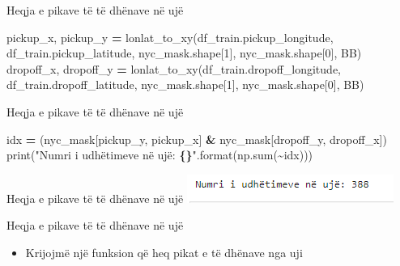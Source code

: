 \documentclass[
  ignorenonframetext,
]{beamer}
\newenvironment{Shaded}{\begin{snugshade}}{\end{snugshade}}
\newcommand{\BuiltInTok}[1]{#1}
\newcommand{\DecValTok}[1]{\textcolor[rgb]{0.00,0.00,0.81}{#1}}
\newcommand{\NormalTok}[1]{#1}
\newcommand{\OperatorTok}[1]{\textcolor[rgb]{0.81,0.36,0.00}{\textbf{#1}}}
\newcommand{\SpecialCharTok}[1]{\textcolor[rgb]{0.81,0.36,0.00}{\textbf{#1}}}
\newcommand{\StringTok}[1]{\textcolor[rgb]{0.31,0.60,0.02}{#1}}
\providecommand{\tightlist}{%
  \setlength{\itemsep}{0pt}\setlength{\parskip}{0pt}}
\begin{document}
\begin{frame}[fragile]{Heqja e pikave të të dhënave në ujë}
\protect\hypertarget{heqja-e-pikave-tuxeb-tuxeb-dhuxebnave-nuxeb-ujuxeb-5}{}

\begin{Shaded}
\begin{Highlighting}[]
\NormalTok{pickup\_x, pickup\_y }\OperatorTok{=}\NormalTok{ lonlat\_to\_xy(df\_train.pickup\_longitude, df\_train.pickup\_latitude, }
\NormalTok{                                  nyc\_mask.shape[}\DecValTok{1}\NormalTok{], nyc\_mask.shape[}\DecValTok{0}\NormalTok{], BB)}
\NormalTok{dropoff\_x, dropoff\_y }\OperatorTok{=}\NormalTok{ lonlat\_to\_xy(df\_train.dropoff\_longitude, df\_train.dropoff\_latitude, }
\NormalTok{                                  nyc\_mask.shape[}\DecValTok{1}\NormalTok{], nyc\_mask.shape[}\DecValTok{0}\NormalTok{], BB)}
\end{Highlighting}
\end{Shaded}
\end{frame}

\begin{frame}[fragile]{Heqja e pikave të të dhënave në ujë}
\protect\hypertarget{heqja-e-pikave-tuxeb-tuxeb-dhuxebnave-nuxeb-ujuxeb-6}{}

\begin{Shaded}
\begin{Highlighting}[]
\NormalTok{idx }\OperatorTok{=}\NormalTok{ (nyc\_mask[pickup\_y, pickup\_x] }\OperatorTok{\&}\NormalTok{ nyc\_mask[dropoff\_y, dropoff\_x])}
\BuiltInTok{print}\NormalTok{(}\StringTok{"Numri i udhëtimeve në ujë: }\SpecialCharTok{\{\}}\StringTok{"}\NormalTok{.}\BuiltInTok{format}\NormalTok{(np.}\BuiltInTok{sum}\NormalTok{(}\OperatorTok{\textasciitilde{}}\NormalTok{idx)))}
\end{Highlighting}
\end{Shaded}
\end{frame}

\begin{frame}{Heqja e pikave të të dhënave në ujë}
\protect\hypertarget{heqja-e-pikave-tuxeb-tuxeb-dhuxebnave-nuxeb-ujuxeb-7}{}
\includegraphics{./Figs/train15.png}
\end{frame}

\begin{frame}{Heqja e pikave të të dhënave në ujë}
\protect\hypertarget{heqja-e-pikave-tuxeb-tuxeb-dhuxebnave-nuxeb-ujuxeb-8}{}
\begin{itemize}
\tightlist
\item
  Krijojmë një funksion që heq pikat e të dhënave nga uji
\end{itemize}
\end{frame}
\end{document}
